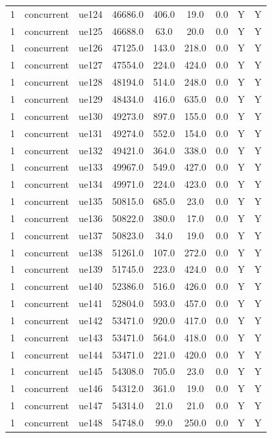 \begin{table}[ht]
\begin{tabular}{|c|c|c|c|c|c|c|c|c|}
1 & concurrent & ue124 & 46686.0 & 406.0 & 19.0 & 0.0 & Y & Y \\
1 & concurrent & ue125 & 46688.0 & 63.0 & 20.0 & 0.0 & Y & Y \\
1 & concurrent & ue126 & 47125.0 & 143.0 & 218.0 & 0.0 & Y & Y \\
1 & concurrent & ue127 & 47554.0 & 224.0 & 424.0 & 0.0 & Y & Y \\
1 & concurrent & ue128 & 48194.0 & 514.0 & 248.0 & 0.0 & Y & Y \\
1 & concurrent & ue129 & 48434.0 & 416.0 & 635.0 & 0.0 & Y & Y \\
1 & concurrent & ue130 & 49273.0 & 897.0 & 155.0 & 0.0 & Y & Y \\
1 & concurrent & ue131 & 49274.0 & 552.0 & 154.0 & 0.0 & Y & Y \\
1 & concurrent & ue132 & 49421.0 & 364.0 & 338.0 & 0.0 & Y & Y \\
1 & concurrent & ue133 & 49967.0 & 549.0 & 427.0 & 0.0 & Y & Y \\
1 & concurrent & ue134 & 49971.0 & 224.0 & 423.0 & 0.0 & Y & Y \\
1 & concurrent & ue135 & 50815.0 & 685.0 & 23.0 & 0.0 & Y & Y \\
1 & concurrent & ue136 & 50822.0 & 380.0 & 17.0 & 0.0 & Y & Y \\
1 & concurrent & ue137 & 50823.0 & 34.0 & 19.0 & 0.0 & Y & Y \\
1 & concurrent & ue138 & 51261.0 & 107.0 & 272.0 & 0.0 & Y & Y \\
1 & concurrent & ue139 & 51745.0 & 223.0 & 424.0 & 0.0 & Y & Y \\
1 & concurrent & ue140 & 52386.0 & 516.0 & 426.0 & 0.0 & Y & Y \\
1 & concurrent & ue141 & 52804.0 & 593.0 & 457.0 & 0.0 & Y & Y \\
1 & concurrent & ue142 & 53471.0 & 920.0 & 417.0 & 0.0 & Y & Y \\
1 & concurrent & ue143 & 53471.0 & 564.0 & 418.0 & 0.0 & Y & Y \\
1 & concurrent & ue144 & 53471.0 & 221.0 & 420.0 & 0.0 & Y & Y \\
1 & concurrent & ue145 & 54308.0 & 705.0 & 23.0 & 0.0 & Y & Y \\
1 & concurrent & ue146 & 54312.0 & 361.0 & 19.0 & 0.0 & Y & Y \\
1 & concurrent & ue147 & 54314.0 & 21.0 & 21.0 & 0.0 & Y & Y \\
1 & concurrent & ue148 & 54748.0 & 99.0 & 250.0 & 0.0 & Y & Y \\

\end{tabular}
\end{table}
